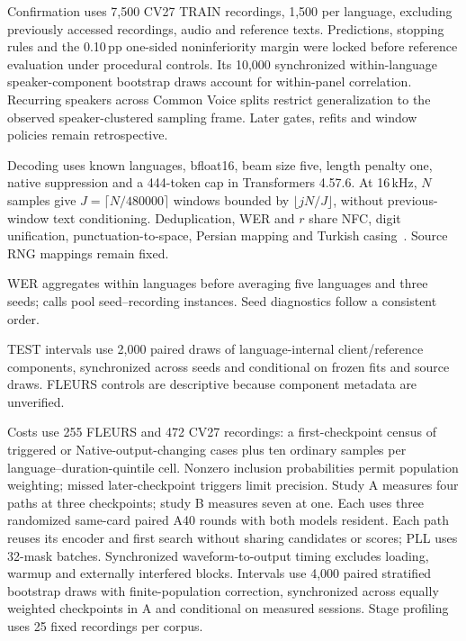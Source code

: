 \documentclass[conference,letterpaper]{IEEEtran}
\begin{document}
Confirmation uses 7,500 CV27 TRAIN recordings, 1,500 per language, excluding previously accessed recordings, audio and reference texts. Predictions, stopping rules and the 0.10\,pp one-sided noninferiority margin were locked before reference evaluation under procedural controls. Its 10,000 synchronized within-language speaker-component bootstrap draws account for within-panel correlation. Recurring speakers across Common Voice splits restrict generalization to the observed speaker-clustered sampling frame. Later gates, refits and window policies remain retrospective.

Decoding uses known languages, bfloat16, beam size five, length penalty one, native suppression and a 444-token cap in Transformers 4.57.6. At 16\,kHz, $N$ samples give $J=\lceil N/480000\rceil$ windows bounded by $\lfloor jN/J\rfloor$, without previous-window text conditioning. Deduplication, WER and $r$ share NFC, digit unification, punctuation-to-space, Persian mapping and Turkish casing~\cite{normalization}. Source RNG mappings remain fixed.

WER aggregates within languages before averaging five languages and three seeds; calls pool seed--recording instances. Seed diagnostics follow a consistent order.

\pagebreak[4]
TEST intervals use 2,000 paired draws of language-internal client/reference components, synchronized across seeds and conditional on frozen fits and source draws. FLEURS controls are descriptive because component metadata are unverified.

Costs use 255 FLEURS and 472 CV27 recordings: a first-checkpoint census of triggered or Native-output-changing cases plus ten ordinary samples per language--duration-quintile cell. Nonzero inclusion probabilities permit population weighting; missed later-checkpoint triggers limit precision. Study A measures four paths at three checkpoints; study B measures seven at one. Each uses three randomized same-card paired A40 rounds with both models resident. Each path reuses its encoder and first search without sharing candidates or scores; PLL uses 32-mask batches. Synchronized waveform-to-output timing excludes loading, warmup and externally interfered blocks. Intervals use 4,000 paired stratified bootstrap draws with finite-population correction, synchronized across equally weighted checkpoints in A and conditional on measured sessions. Stage profiling uses 25 fixed recordings per corpus.
\end{document}
